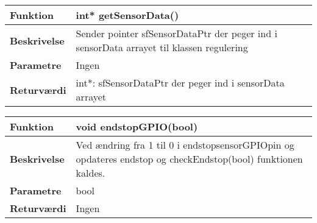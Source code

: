 \begin{center}
    \begin{tabular}{ | l | p{10cm} |}
    \hline
    \textbf{Funktion}	 	& int* getSensorData()										\\ \hline
    \textbf{Beskrivelse} 	& Sender pointer sfSensorDataPtr der peger ind i sensorData arrayet til klassen regulering 		\\ \hline
    \textbf{Parametre}		& Ingen			 										\\ \hline
    \textbf{Returværdi} 	& int*: sfSensorDataPtr der peger ind i sensorData arrayet	 											\\ \hline
    \end{tabular}
\end{center}

\begin{center}
    \begin{tabular}{ | l | p{10cm} |}
    \hline
    \textbf{Funktion}	 	& void endstopGPIO(bool)										\\ \hline
    \textbf{Beskrivelse} 	& Ved ændring fra 1 til 0 i endstopsensorGPIOpin og opdateres endstop og checkEndstop(bool) funktionen kaldes.		\\ \hline
    \textbf{Parametre}		& bool			 										\\ \hline
    \textbf{Returværdi} 	& Ingen		 											\\ \hline
    \end{tabular}
\end{center}
